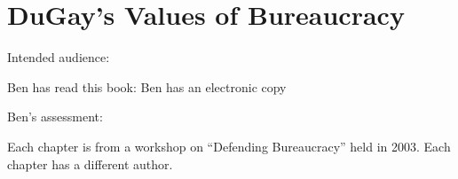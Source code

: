 \section{DuGay's Values of Bureaucracy\label{review:dugay_values}}

\cite{2005_DuGay}

Intended audience:

Ben has read this book: Ben has an electronic copy

Ben's assessment: 



Each chapter is from a workshop on ``Defending
Bureaucracy'' held in 2003. Each chapter has a different author. 